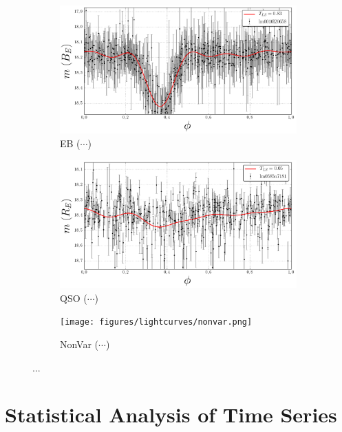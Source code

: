 \begin{figure}[H]
\begin{subfigure}[t]{0.49\textwidth}
	\end{subfigure}
	\begin{subfigure}[t]{0.49\textwidth}
		\centering
		\caption{EB ($\cdots$)}
		\label{fig:lightcurve-lpv}
		\includegraphics[width=\textwidth]{figures/lightcurves/eb.png}		
	\end{subfigure}
	\begin{subfigure}[t]{0.49\textwidth}
		\centering
		\caption{QSO ($\cdots$)}
		\label{fig:lightcurve-qso}
		\includegraphics[width=\textwidth]{figures/lightcurves/qso.png}		
	\end{subfigure}
	\begin{subfigure}[t]{0.49\textwidth}
		\centering
		\caption{NonVar ($\cdots$)}
		\label{fig:lightcurve-nonvar}
		\texttt{[image: figures/lightcurves/nonvar.png]}		
	\end{subfigure}
	\caption[...]{...}
	\label{fig:various-light-curves}
\end{figure}


\section{Statistical Analysis of Time Series}
\label{sec:statistical-analysis-time-series}

